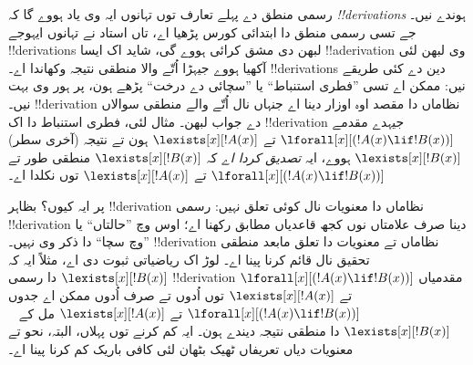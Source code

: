 \documentclass[../../../include/open-logic-section]{subfiles}
\begin{document}
رسمی منطق دے پہلے تعارف توں تہانوں ایہ
وی یاد ہووے گا کہ \emph{!!{derivation}s}
ہوندے نیں۔ جے تسی رسمی منطق دا ابتدائی
کورس پڑھیا اے، تاں استاد نے تہانوں ایہوجے
!!{derivation}s لبھن دی مشق کرائی ہووے گی،
شاید اک ایسا !!a{derivation} وی لبھن
لئی آکھیا ہووے جیہڑا اُتّے والا منطقی
نتیجہ وکھاندا اے۔ !!{derivation}s دین
دے کئی طریقے نیں: ممکن اے تسی ”فطری
استنباط“ یا ”سچائی دے درخت“ پڑھے ہون،
پر ہور وی بہت نیں۔ !!{derivation} نظاماں
دا مقصد اوہ اوزار دینا اے جنہاں نال اُتّے
والے منطقی سوالاں دے جواب لبھن۔ مثال لئی،
فطری استنباط دا اک !!{derivation} جیہدے
مقدمے
$\lforall[x][(!A(x) \lif !B(x))]$
تے $\lexists[x][!A(x)]$ ہون تے نتیجہ
(آخری سطر) $\lexists[x][!B(x)]$ ہووے،
ایہ \emph{تصدیق کردا اے} کہ
$\lexists[x][!B(x)]$ منطقی طور تے
$\lforall[x][(!A(x) \lif !B(x))]$
تے $\lexists[x][!A(x)]$ توں نکلدا اے۔

پر ایہ کیوں؟ بظاہر !!{derivation} نظاماں
دا معنویات نال کوئی تعلق نہیں: رسمی
!!{derivation} دینا صرف علامتاں نوں
کجھ قاعدیاں مطابق رکھنا اے؛ اوس وچ
”حالتاں“ یا ”وچ سچا“ دا ذکر وی نہیں۔
!!{derivation} نظاماں تے معنویات دا
تعلق مابعد منطقی تحقیق نال قائم کرنا
پینا اے۔ لوڑ اک ریاضیاتی ثبوت دی اے،
مثلاً ایہ کہ
$\lexists[x][!B(x)]$ دا رسمی
!!{derivation} مقدمیاں
$\lforall[x][(!A(x) \lif !B(x))]$
تے $\lexists[x][!A(x)]$ توں
اُدوں تے صرف اُدوں
ممکن اے جدوں
$\lforall[x][(!A(x) \lif !B(x))]$
تے $\lexists[x][!A(x)]$ مل کے
~$\lexists[x][!B(x)]$ دا منطقی
نتیجہ دیندے ہون۔ ایہ کم کرنے توں
پہلاں، البتہ، نحو تے معنویات دیاں
تعریفاں ٹھیک بٹھان لئی کافی باریک
کم کرنا پینا اے۔
\end{document}
